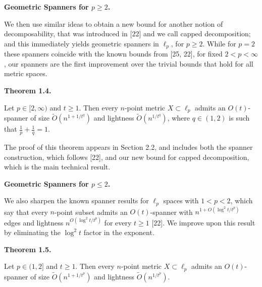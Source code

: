 \par
\par
\par
\par\medskip\noindent\textbf{Geometric Spanners for $p\geq 2$.}\par
We then use similar ideas to obtain a new bound for another notion of decomposability, that was introduced in [22] and we call capped decomposition; and this immediately yields geometric spanners in $\ell_{p}$, for $p\geq 2$. While for $p=2$ these spanners coincide with the known bounds from [25, 22], for fixed $2<p<\infty$, our spanners are the first improvement over the trivial bounds that hold for all metric spaces.
\par
\par
\par\medskip\noindent\textbf{Theorem 1.4.}\par
Let $p\in[2,\infty)$ and $t\geq 1$. Then every $n$-point metric $X\subset\ell_{p}$ admits an $O(t)$-spanner of size $\tilde{O}\left(n^{1+1/t^{q}}\right)$ and lightness $\tilde{O}\left(n^{1/t^{q}}\right)$, where $q\in(1,2)$ is such that $\frac{1}{p}+\frac{1}{q}=1$.
\par
\par
\par
The proof of this theorem appears in Section 2.2, and includes both the spanner construction, which follows [22], and our new bound for capped decomposition, which is the main technical result.
\par
\par
\par
\par\medskip\noindent\textbf{Geometric Spanners for $p\leq 2$.}\par
We also sharpen the known spanner results for $\ell_{p}$ spaces with $1<p<2$, which say that every $n$-point subset admits an $O(t)$-spanner with $n^{1+O(\log^{2}{t}/t^{p})}$ edges and lightness $n^{O(\log^{2}{t}/t^{p})}$ for every $t\geq 1$ [22]. We improve upon this result by eliminating the $\log^{2}{t}$ factor in the exponent.
\par
\par
\par\medskip\noindent\textbf{Theorem 1.5.}\par
Let $p\in(1,2]$ and $t\geq 1$. Then every $n$-point metric $X\subset\ell_{p}$ admits an $O(t)$-spanner of size $\tilde{O}(n^{1+1/t^{p}})$ and lightness $\tilde{O}(n^{1/t^{p}})$.
\par
\par
